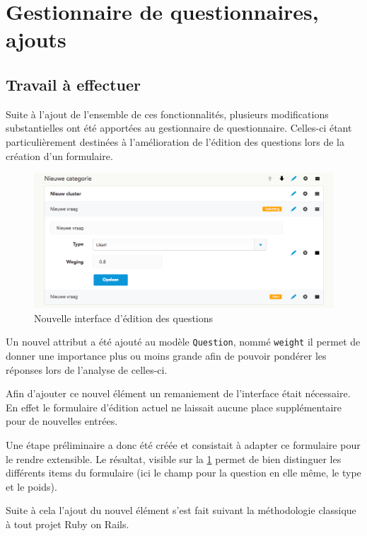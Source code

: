\documentclass[12pt,a4paper]{book}
\begin{document}
\section{Gestionnaire de questionnaires, ajouts}

\label{section.gestionnaire_questionnaires_2}

\subsection{Travail à effectuer}

Suite à l'ajout de l'ensemble de ces fonctionnalités, plusieurs modifications substantielles ont été apportées au gestionnaire de questionnaire. Celles-ci étant particulièrement destinées à l'amélioration de l'édition des questions lors de la création d'un formulaire.

\begin{figure}[htp]
\centering
\includegraphics[scale=.45]{img/editor.png}
 \caption{Nouvelle interface d'édition des questions}
 \label{fig.editor}
\end{figure}

Un nouvel attribut a été ajouté au modèle \texttt{Question}, nommé \texttt{weight} il permet de donner une importance plus ou moins grande afin de pouvoir pondérer les réponses lors de l'analyse de celles-ci.

Afin d'ajouter ce nouvel élément un remaniement de l'interface était nécessaire. En effet le formulaire d'édition actuel ne laissait aucune place supplémentaire pour de nouvelles entrées.

Une étape préliminaire a donc été créée et consistait à adapter ce formulaire pour le rendre extensible. Le résultat, visible sur la \cref{fig.editor} permet de bien distinguer les différents items du formulaire (ici le champ pour la question en elle même, le type et le poids).

Suite à cela l'ajout du nouvel élément s'est fait suivant la méthodologie classique à tout projet Ruby on Rails.
\end{document}
